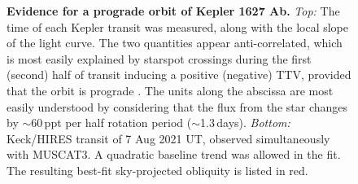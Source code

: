 \documentclass[12pt,modern,twocolumn,tighten]{aastex63}
\begin{document}
\begin{figure}[tp]
	\begin{center}
		\leavevmode
		
	\end{center}
	\vspace{-0.7cm}
	\caption{
		{\bf Evidence for a prograde orbit of Kepler 1627 Ab.}
    {\it Top:} 
    The time of each Kepler transit was measured, along with the local slope
    of the light curve.  The two quantities appear anti-correlated,
    which is most easily explained by starspot crossings during the
    first (second) half of transit inducing a positive (negative) TTV,
    provided that the orbit is prograde \citep{mazeh_time_2015}.  The
    units along the abscissa are most easily understood by considering
    that the flux from the star changes by $\sim$60\,ppt per half
    rotation period ($\sim$1.3\,days).
        {\it Bottom:} Keck/HIRES transit of 7 Aug 2021 UT,
    observed simultaneously with MUSCAT3.  A quadratic baseline trend was allowed
    in the fit.
    The resulting best-fit sky-projected obliquity is listed in red.
    \label{fig:obliquity}
	}
\end{figure}
\end{document}
